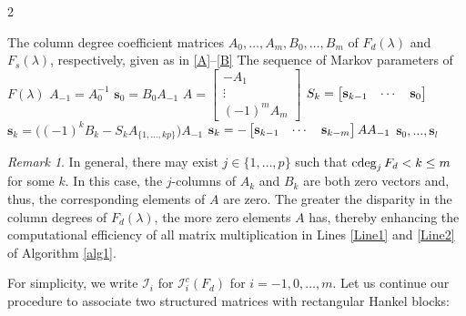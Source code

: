 \documentclass[12pt,reqno]{amsart}
\theoremstyle{plain}
\numberwithin{equation}{section}
\theoremstyle{remark}
\newtheorem{remark}[theorem]{Remark}
\begin{document}
\begin{algorithm}
\caption{}
\begin{multicols}{2}
\begin{algorithmic}[1]\label{alg1}
\REQUIRE The column degree coefficient matrices $A_0, \ldots, A_m, B_0, \ldots, B_m$ of $F_d(\lambda)$ and $F_s(\lambda)$, respectively, given as in \eqref{A}--\eqref{B}
\ENSURE The sequence of Markov parameters of $F(\lambda)$
\STATE $A_{-1}=A_0^{-1}$
\STATE $\mathbf{s}_0=B_{0}A_{-1}$
\STATE $A=\begin{bmatrix}
-A_1\\
\vdots\\
(-1)^m A_m
\end{bmatrix}$
\STATE 
$S_k=\begin{bmatrix} {\bf s}_{k-1} & \cdots & {\bf s}_{0}\end{bmatrix}$
    \STATE $\mathbf{s}_k=\big((-1)^kB_k-S_kA_{\{1,\ldots,kp\}}\big)A_{-1}$ \label{Line1}
\ENDFOR
{}
    \STATE $\mathbf{s}_k=-\begin{bmatrix}{\bf s}_{k-1} & \cdots & {\bf s}_{k-m}\end{bmatrix}AA_{-1}$ \label{Line2}
\ENDFOR
\ENDIF
\RETURN  $\mathbf{s}_0, \ldots, \mathbf{s}_{l}$ 
\end{algorithmic}
\end{multicols}
\end{algorithm}

\begin{remark}
In general, there may exist $j\in \{1,\ldots,p\}$ such that ${\rm cdeg}_j\,F_d<k\leq m$ for some $k$. In this case, the $j$-columns of $A_k$ and $B_k$ are both zero vectors and, thus, the corresponding elements of $A$ are zero. The greater the disparity in the column degrees of $F_d(\lambda)$, the more zero elements  $A$ has, thereby enhancing the computational efficiency of all matrix multiplication in Lines \ref{Line1} and \ref{Line2} of Algorithm \ref{alg1}. 
\end{remark}

For simplicity, we write $\mathcal I_i$ for $\mathcal I_i^c(F_d)$ for $i=-1,0,\ldots,m$.
 Let us continue our procedure to associate two structured matrices with rectangular Hankel blocks:
\end{document}
